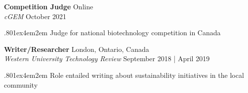 \documentclass[a4paper,9pt]{extarticle}
\begin{document}
\noindent
\begin{minipage}{1\textwidth}
\setlength{\parindent}{15pt} %
	\noindent
	\textbf{Competition Judge} \hfill Online\\ %
	\textit{cGEM} \hfill October 2021 \par%
	{\hsize.80\linewidth\parskip1ex\hangindent4em\parindent2em 
	\setlength{\parskip}{0pt} %
		\indent Judge for national biotechnology competition in Canada \par}
\end{minipage}
\vspace{\parskip}

\noindent
\begin{minipage}{1\textwidth}
\setlength{\parindent}{15pt} %
	\noindent
	\textbf{Writer/Researcher} \hfill London, Ontario, Canada\\ %
	\textit{Western University Technology Review} \hfill September 2018 | April 2019 \par%
	{\hsize.80\linewidth\parskip1ex\hangindent4em\parindent2em 
	\setlength{\parskip}{0pt} %
		\indent Role entailed writing about sustainability initiatives in the local community \par}
\end{minipage}


    
\end{document}
